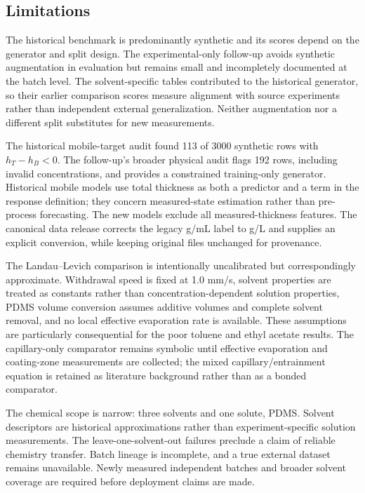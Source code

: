 \documentclass[11pt]{article}
\begin{document}
\subsection{Limitations}
The historical benchmark is predominantly synthetic and its scores depend on the generator and split design. The experimental-only follow-up avoids synthetic augmentation in evaluation but remains small and incompletely documented at the batch level. The solvent-specific tables contributed to the historical generator, so their earlier comparison scores measure alignment with source experiments rather than independent external generalization. Neither augmentation nor a different split substitutes for new measurements.

The historical mobile-target audit found 113 of 3000 synthetic rows with $h_T-h_B<0$. The follow-up's broader physical audit flags 192 rows, including invalid concentrations, and provides a constrained training-only generator. Historical mobile models use total thickness as both a predictor and a term in the response definition; they concern measured-state estimation rather than pre-process forecasting. The new models exclude all measured-thickness features. The canonical data release corrects the legacy g/mL label to g/L and supplies an explicit conversion, while keeping original files unchanged for provenance.

The Landau--Levich comparison is intentionally uncalibrated but correspondingly approximate. Withdrawal speed is fixed at 1.0 mm/s, solvent properties are treated as constants rather than concentration-dependent solution properties, PDMS volume conversion assumes additive volumes and complete solvent removal, and no local effective evaporation rate is available. These assumptions are particularly consequential for the poor toluene and ethyl acetate results. The capillary-only comparator remains symbolic until effective evaporation and coating-zone measurements are collected; the mixed capillary/entrainment equation is retained as literature background rather than as a bonded comparator.

The chemical scope is narrow: three solvents and one solute, PDMS. Solvent descriptors are historical approximations rather than experiment-specific solution measurements. The leave-one-solvent-out failures preclude a claim of reliable chemistry transfer. Batch lineage is incomplete, and a true external dataset remains unavailable. Newly measured independent batches and broader solvent coverage are required before deployment claims are made.
\end{document}
